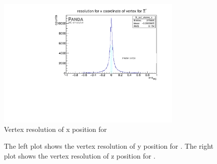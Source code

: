 		\begin{figure}
			\centering
			\includegraphics[width=0.8\textwidth]{./plots/Xi/XiPlus_vtxres_x.pdf}
			\caption{\propose Vertex resolution of x position for \anticascade}
			\label{fig:xi_vtxres_x}
			
		\end{figure}
		
		\begin{figure}
			\caption{\propose The left plot shows the vertex resolution of y position for \anticascade. The right plot shows the vertex
					 resolution of z position for \anticascade.}
			\label{fig:xi_vtxres_yz}
			
		\end{figure}
	
